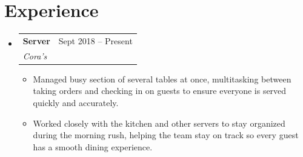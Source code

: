 \documentclass[letterpaper,10.5pt]{article}
\makeatletter
\newcommand{\resumeItem}[1]{
  \item\small{
    {#1 \vspace{-2pt}}
  }
}
\newcommand{\resumeSubheading}[4]{
  \vspace{-2pt}\item
    \begin{tabular*}{0.97\textwidth}[t]{l@{\extracolsep{\fill}}r}
      \textbf{#1} & #2 \\
      \textit{\small#3} & \textit{\small #4} \\
    \end{tabular*}\vspace{-7pt}
}
\newcommand{\resumeSubSubheading}[2]{
    \item
    \begin{tabular*}{0.97\textwidth}{l@{\extracolsep{\fill}}r}
      \textit{\small#1} & \textit{\small #2} \\
    \end{tabular*}\vspace{-7pt}
}
\newcommand{\resumeSubHeadingListStart}{\begin{itemize}[leftmargin=0.15in, label={}]}
\newcommand{\resumeSubHeadingListEnd}{\end{itemize}}
\newcommand{\resumeItemListStart}{\begin{itemize}}
\newcommand{\resumeItemListEnd}{\end{itemize}\vspace{-5pt}}
\makeatother
\begin{document}
\section{Experience}
  \resumeSubHeadingListStart
    \resumeSubheading
      {Server}{Sept 2018 -- Present}
      {Cora's}{}
      \resumeItemListStart
        \resumeItem{Managed busy section of several tables at once, multitasking between taking orders and checking in on guests to ensure everyone is served quickly and accurately.}
        \resumeItem{Worked closely with the kitchen and other servers to stay organized during the morning rush, helping the team stay on track so every guest has a smooth dining experience.}
      \resumeItemListEnd
      


  \resumeSubHeadingListEnd
\end{document}
